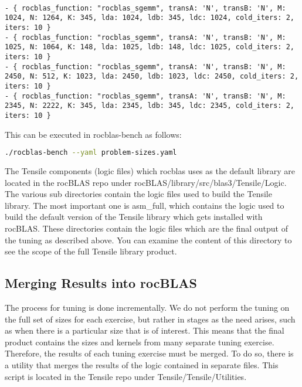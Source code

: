\documentclass[]{article}
\begin{document}
\begin{verbatim}

- { rocblas_function: "rocblas_sgemm", transA: 'N', transB: 'N', M: 1024, N: 1264, K: 345, lda: 1024, ldb: 345, ldc: 1024, cold_iters: 2, iters: 10 }
- { rocblas_function: "rocblas_sgemm", transA: 'N', transB: 'N', M: 1025, N: 1064, K: 148, lda: 1025, ldb: 148, ldc: 1025, cold_iters: 2, iters: 10 }
- { rocblas_function: "rocblas_sgemm", transA: 'N', transB: 'N', M: 2450, N: 512, K: 1023, lda: 2450, ldb: 1023, ldc: 2450, cold_iters: 2, iters: 10 }
- { rocblas_function: "rocblas_sgemm", transA: 'N', transB: 'N', M: 2345, N: 2222, K: 345, lda: 2345, ldb: 345, ldc: 2345, cold_iters: 2, iters: 10 }

\end{verbatim}

\noindent
This can be executed in rocblas-bench as follows:

\begin{lstlisting}[language=bash]
./rocblas-bench --yaml problem-sizes.yaml
\end{lstlisting}

The Tensile components (logic files) which rocblas uses as the default library are located in the rocBLAS repo under rocBLAS/library/src/blas3/Tensile/Logic. The various sub directories contain the logic files used to build the Tensile library. The most important one is asm\_full, which contains the logic used to build the default version of the Tensile library which gets installed with rocBLAS. These directories contain the logic files which are the final output of the tuning as described above. You can examine the content of this directory to see the scope of the full Tensile library product.

\subsection{Merging Results into rocBLAS}

The process for tuning is done incrementally. We do not perform the tuning on the full set of sizes for each exercise, but rather in stages as the need arises, such as when there is a particular size that is of interest. This means that the final product contains the sizes and kernels from many separate tuning exercise. Therefore, the results of each tuning exercise must be merged. To do so, there is a utility that merges the results of the logic contained in separate files. This script is located in the Tensile repo under Tensile/Tensile/Utilities.
\end{document}
